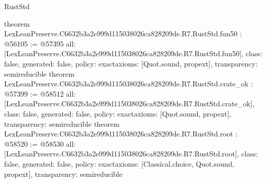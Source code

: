 \begin{lexlean}{RustStd}
\begin{coremodule}
{}
theorem LexLeanPreserve.C6632b3a2e999d115038026ca828209de.R7.RustStd.fun50 : @56105 := @57395 {
  all: [LexLeanPreserve.C6632b3a2e999d115038026ca828209de.R7.RustStd.fun50],
  class: false,
  generated: false,
  policy: exact{axioms: [Quot.sound, propext]},
  transparency: semireducible
}
theorem LexLeanPreserve.C6632b3a2e999d115038026ca828209de.R7.RustStd.crate_ok : @57399 := @58512 {
  all: [LexLeanPreserve.C6632b3a2e999d115038026ca828209de.R7.RustStd.crate_ok],
  class: false,
  generated: false,
  policy: exact{axioms: [Quot.sound, propext]},
  transparency: semireducible
}
theorem LexLeanPreserve.C6632b3a2e999d115038026ca828209de.R7.RustStd.root : @58520 := @58530 {
  all: [LexLeanPreserve.C6632b3a2e999d115038026ca828209de.R7.RustStd.root],
  class: false,
  generated: false,
  policy: exact{axioms: [Classical.choice, Quot.sound, propext]},
  transparency: semireducible
}


\end{coremodule}
\end{lexlean}
